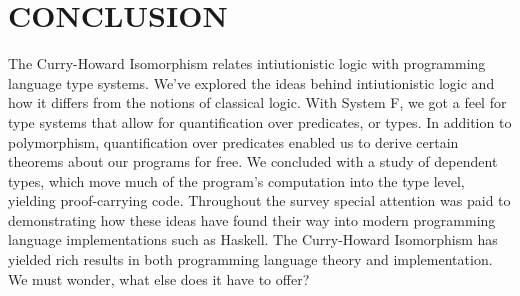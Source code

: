 \chapter{CONCLUSION}
The Curry-Howard Isomorphism relates intiutionistic logic with programming language type systems.
We've explored the ideas behind intiutionistic logic and how it differs from the notions of classical logic.
With System F, we got a feel for type systems that allow for quantification over predicates, or types.
In addition to polymorphism, quantification over predicates enabled us to derive certain theorems about our programs for free.
We concluded with a study of dependent types, which move much of the program's computation into the type level, yielding proof-carrying code.
Throughout the survey special attention was paid to demonstrating how these ideas have found their way into modern programming language implementations such as Haskell.
The Curry-Howard Isomorphism has yielded rich results in both programming language theory and implementation. We must wonder, what else does it have to offer?
